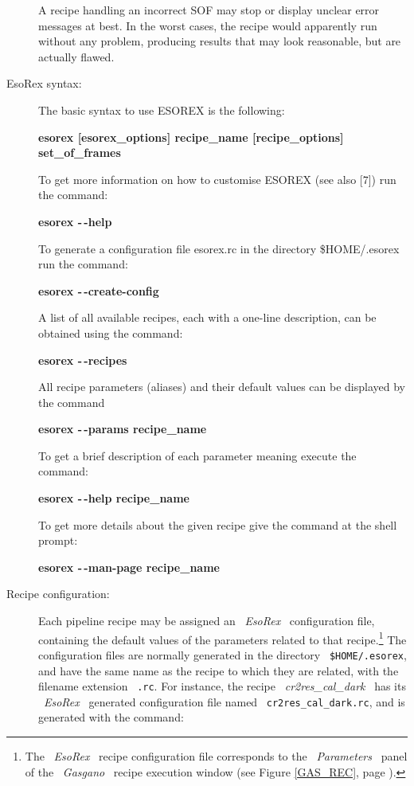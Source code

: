 \begin{description}
A recipe handling an incorrect SOF may stop or display unclear 
error messages at best. In the worst cases, the recipe 
would apparently run without any problem, producing results that may 
look reasonable, but are actually flawed.

\item [EsoRex syntax:]

The basic syntax to use ESOREX is the following:

{\bf esorex [esorex\_options] recipe\_name [recipe\_options] set\_of\_frames}

To get more information on how to customise ESOREX (see also [7]) run the command:

{\bf esorex -\,-help}

To generate a configuration file esorex.rc in the directory \${HOME}/.esorex run the command:

{\bf esorex -\,-create-config}

A list of all available recipes, each with a one-line description, can be 
obtained using the command:

{\bf esorex -\,-recipes}

All recipe parameters (aliases) and their default values can be displayed by 
the command

{\bf esorex -\,-params recipe\_name}

To get a brief description of each parameter meaning execute the command:

{\bf esorex -\,-help recipe\_name}

To get more details about the given recipe give the command at the shell 
prompt:

{\bf esorex -\,-man-page recipe\_name}


\item [Recipe configuration:]

Each pipeline recipe may be assigned an \ {\it EsoRex} \ configuration 
file, containing the default values of the parameters related to that 
recipe.\footnote{The \ {\it EsoRex} \ recipe configuration file 
corresponds to the \ {\it Parameters} \ panel of the \ {\it Gasgano} \ 
recipe execution window (see Figure \ref{GAS_REC}, page \pageref{GAS_REC}).}
The configuration files are normally generated in the directory 
\ {\tt \$HOME/.esorex}, 
and have the same name as the recipe to which they are related, 
with the filename extension \ {\tt .rc}. For instance, the recipe 
\ {\it cr2res\_cal\_dark} \ has its \ {\it EsoRex} \ generated configuration 
file named \ {\tt cr2res\_cal\_dark.rc}, and is generated with the command:


\end{description}
